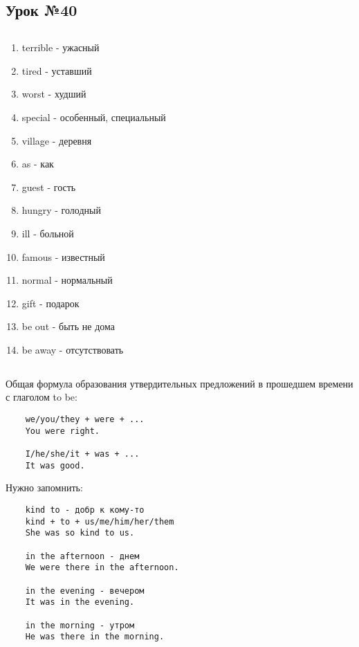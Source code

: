 \subsection{Урок №40}

\subsection*{}
\begin{multicols}{2}
    \begin{enumerate}\setlength{\itemsep}{0pt}
        \item terrible - ужасный
        \item tired - уставший
        \item worst - худший
        \item special - особенный, специальный
        \item village - деревня
        \item as - как
        \item guest - гость
        \item hungry - голодный
        \item ill - больной
        \item famous - известный
        \item normal - нормальный
        \item gift - подарок
        \item be out - быть не дома
        \item be away - отсутствовать
    \end{enumerate}
\end{multicols}

\subsection*{}
Общая формула образования утвердительных предложений в прошедшем времени с глаголом to be:
\begin{verbatim}
    we/you/they + were + ...
    You were right.

    I/he/she/it + was + ...
    It was good.
\end{verbatim}

Нужно запомнить:
\begin{verbatim}
    kind to - добр к кому-то
    kind + to + us/me/him/her/them
    She was so kind to us.

    in the afternoon - днем
    We were there in the afternoon.

    in the evening - вечером
    It was in the evening.

    in the morning - утром
    He was there in the morning.
\end{verbatim}
